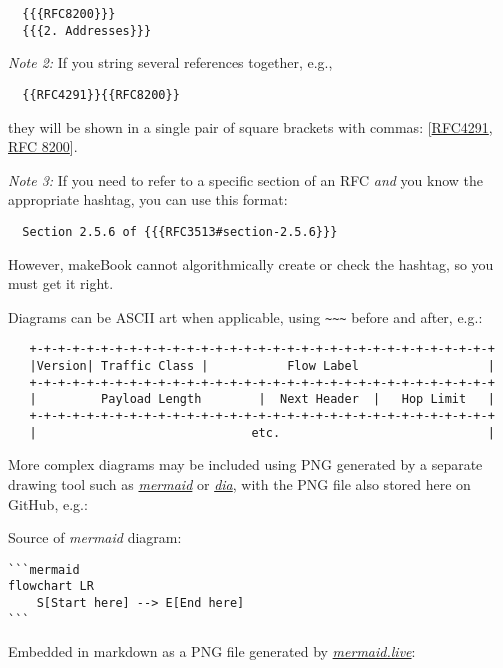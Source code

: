 \documentclass[
]{article}
\begin{document}
\begin{verbatim}
  {{{RFC8200}}}
  {{{2. Addresses}}}
\end{verbatim}

\emph{Note 2:} If you string several references together, e.g.,

\begin{verbatim}
  {{RFC4291}}{{RFC8200}}
\end{verbatim}

they will be shown in a single pair of square brackets with commas:
{[}\href{https://www.rfc-editor.org/info/rfc4291}{RFC4291},
\href{https://www.rfc-editor.org/info/rfc8200}{RFC 8200}{]}.

\emph{Note 3:} If you need to refer to a specific section of an RFC
\emph{and} you know the appropriate hashtag, you can use this format:

\begin{verbatim}
  Section 2.5.6 of {{{RFC3513#section-2.5.6}}}
\end{verbatim}

However, makeBook cannot algorithmically create or check the hashtag, so
you must get it right.

Diagrams can be ASCII art when applicable, using
\texttt{\textasciitilde{}\textasciitilde{}\textasciitilde{}} before and
after, e.g.:

\begin{verbatim}
   +-+-+-+-+-+-+-+-+-+-+-+-+-+-+-+-+-+-+-+-+-+-+-+-+-+-+-+-+-+-+-+-+
   |Version| Traffic Class |           Flow Label                  |
   +-+-+-+-+-+-+-+-+-+-+-+-+-+-+-+-+-+-+-+-+-+-+-+-+-+-+-+-+-+-+-+-+
   |         Payload Length        |  Next Header  |   Hop Limit   |
   +-+-+-+-+-+-+-+-+-+-+-+-+-+-+-+-+-+-+-+-+-+-+-+-+-+-+-+-+-+-+-+-+
   |                              etc.                             |
\end{verbatim}

More complex diagrams may be included using PNG generated by a separate
drawing tool such as \href{https://mermaid.live}{\emph{mermaid}} or
\href{http://dia-installer.de/}{\emph{dia}}, with the PNG file also
stored here on GitHub, e.g.:

Source of \emph{mermaid} diagram:

\begin{verbatim}
```mermaid
flowchart LR
    S[Start here] --> E[End here]
```
\end{verbatim}

Embedded in markdown as a PNG file generated by
\href{https://mermaid.live}{\emph{mermaid.live}}:
\end{document}
